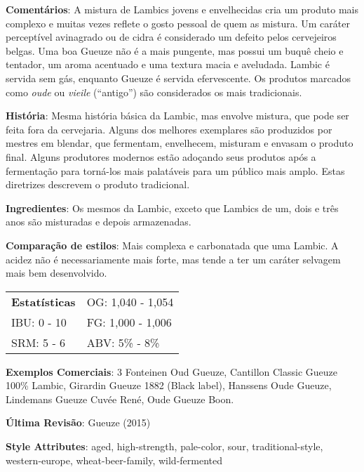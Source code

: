 \textbf{Comentários}: A mistura de Lambics jovens e envelhecidas cria um produto mais complexo e muitas vezes reflete o gosto pessoal de quem as mistura. Um caráter perceptível avinagrado ou de cidra é considerado um defeito pelos cervejeiros belgas. Uma boa Gueuze não é a mais pungente, mas possui um buquê cheio e tentador, um aroma acentuado e uma textura macia e aveludada. Lambic é servida sem gás, enquanto Gueuze é servida efervescente. Os produtos marcados como \textit{oude} ou \textit{vieile} (“antigo”) são considerados os mais tradicionais.

\textbf{História}: Mesma história básica da Lambic, mas envolve mistura, que pode ser feita fora da cervejaria. Alguns dos melhores exemplares são produzidos por mestres em blendar, que fermentam, envelhecem, misturam e envasam o produto final. Alguns produtores modernos estão adoçando seus produtos após a fermentação para torná-los mais palatáveis para um público mais amplo. Estas diretrizes descrevem o produto tradicional.

\textbf{Ingredientes}: Os mesmos da Lambic, exceto que Lambics de um, dois e três anos são misturadas e depois armazenadas.

\textbf{Comparação de estilos}: Mais complexa e carbonatada que uma Lambic. A acidez não é necessariamente mais forte, mas tende a ter um caráter selvagem mais bem desenvolvido.

\begin{tabular}{@{}p{35mm}p{35mm}@{}}
  \textbf{Estatísticas} & OG: 1,040 - 1,054 \\
  IBU: 0 - 10  & FG: 1,000 - 1,006  \\
  SRM: 5 - 6  & ABV: 5\% - 8\%
\end{tabular}

\textbf{Exemplos Comerciais}: 3 Fonteinen Oud Gueuze, Cantillon Classic Gueuze 100\% Lambic, Girardin Gueuze 1882 (Black label), Hanssens Oude Gueuze, Lindemans Gueuze Cuvée René, Oude Gueuze Boon.

\textbf{Última Revisão}: Gueuze (2015)

\textbf{Style Attributes}: aged, high-strength, pale-color, sour, traditional-style, western-europe, wheat-beer-family, wild-fermented

